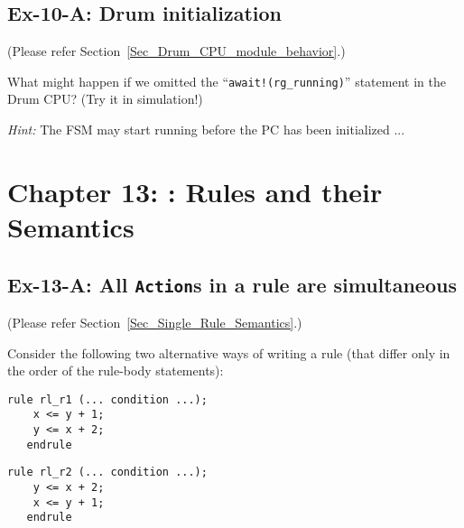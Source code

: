 
\subsection*{Ex-10-A: Drum initialization}
\label{Ex-10-A-Drum-initialization}

(Please refer Section~\ref{Sec_Drum_CPU_module_behavior}.)

What might happen if we omitted the ``{\tt await!(rg\_running)}''
statement in the Drum CPU? (Try it in simulation!)

\emph{Hint:} The FSM may start running before the PC has been initialized ...


\hdivider

\section*{Chapter 13: {\BSV}: Rules and their Semantics}


\subsection*{Ex-13-A: All {\tt Action}s in a rule are simultaneous}
\label{Ex-13-A-Simultaneous-Actions}

(Please refer Section~\ref{Sec_Single_Rule_Semantics}.)

Consider the following two alternative ways of writing a rule (that
differ only in the order of the rule-body statements):

\begin{center}
\begin{minipage}{0.4\textwidth}
 {\footnotesize
 \begin{Verbatim}[frame=single, label=BSV]
   rule rl_r1 (... condition ...);
    x <= y + 1;
    y <= x + 2;
   endrule
 \end{Verbatim}
 }
\end{minipage}
\hmm
\begin{minipage}{0.4\textwidth}
 {\footnotesize
 \begin{Verbatim}[frame=single,label=BSV]
   rule rl_r2 (... condition ...);
    y <= x + 2;
    x <= y + 1;
   endrule
 \end{Verbatim}
 }
\end{minipage}
\end{center}

